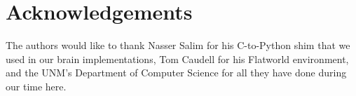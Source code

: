 \section{Acknowledgements} \label{sec:Ack}
The authors would like to thank Nasser Salim for his C-to-Python shim that
we used in our brain implementations, Tom Caudell for his Flatworld
environment, and the UNM's Department of Computer Science for all they have
done during our time here.

